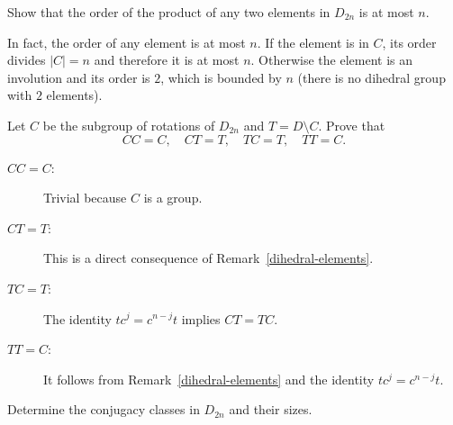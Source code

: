 \begin{probl}
    Show that the order of the product of any two elements in $D_{2n}$ is at most $n$.
\end{probl}

\begin{solution} In fact, the order of any element is at most $n$. If the element is in $C$, its order divides $|C|=n$ and therefore it is at most $n$. Otherwise the element is an involution and its order is $2$, which is bounded by $n$ (there is no dihedral group with $2$ elements).  \end{solution}

\begin{probl}\label{chat-2.B.5}
    Let\/ $C$ be the subgroup of rotations of\/ $D_{2n}$ and\/ $T=D\setminus C$. Prove that
    $$
        CC=C,\quad CT=T,\quad TC=T,\quad TT=C.
    $$
\end{probl}

\begin{solution}
\begin{description}
    \item[\upshape$CC=C$:] Trivial because $C$ is a group.
    \item[\upshape$CT=T$:] This is a direct consequence of Remark~\ref{dihedral-elements}.
    \item[\upshape$TC=T$:] The identity $tc^j=c^{n-j}t$ implies $CT=TC$.
    \item[\upshape$TT=C$:] It follows from Remark~\ref{dihedral-elements} and the identity $tc^j=c^{n-j}t$.
\end{description}
\end{solution}

\begin{probl}\label{chat-2.B.6}
    Determine the conjugacy classes in $D_{2n}$ and their sizes.
\end{probl}

